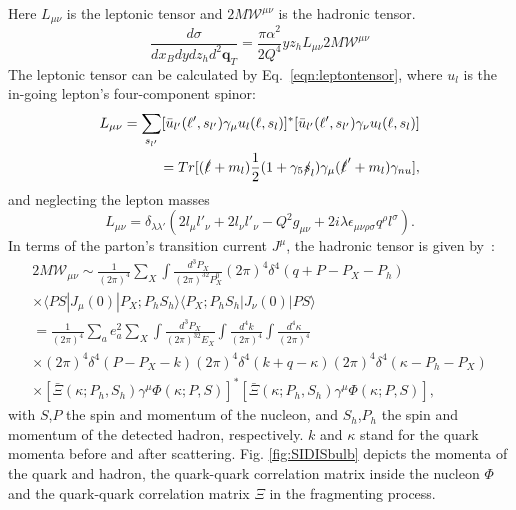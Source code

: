 Here $L_{\mu\nu}$ is the leptonic tensor and $2M\mathcal{W}^{\mu\nu}$ is the hadronic tensor.~\cite{TransversePN,CompleteTreeLevel}
\begin{equation}
\frac{d\sigma}{dx_Bdydz_hd^2\boldsymbol{q}_T} = \frac{\pi \alpha^2}{2Q^4}yz_hL_{\mu\nu}2M\mathcal{W}^{\mu\nu}
\label{eqn:SIDIScrosssubsection}
\end{equation}
The leptonic tensor can be calculated by Eq.~\ref{eqn:leptontensor}, where $u_l$ is the in-going lepton's four-component spinor:
\begin{equation}
\begin{aligned}
L_{\mu\nu}  =\sum_{s_{l'}}[\bar{u}_{l'}(\ell',s_{l'})\gamma_{\mu}u_l(\ell,s_l)]^{\ast}[\bar{u}_{l'}(\ell',s_{l'})\gamma_{\nu}u_l(\ell,s_l)] \\
=Tr[(\slashed{\ell}+m_l)\frac{1}{2}(1+\gamma_5\slashed{s}_l)\gamma_{\mu}(\slashed{\ell}'+m_l)\gamma_{nu}],
\end{aligned}
\label{eqn:leptontensor}
\end{equation}
and neglecting the lepton masses
\begin{equation}
L_{\mu\nu}  =\delta_{\lambda\lambda'}(2l_{\mu}l'_{\nu}+2l_{\nu}l'_{\nu}-Q^2g_{\mu\nu}+2i\lambda\epsilon_{\mu\nu\rho\sigma}q^{\rho}l^{\sigma}).
\label{eqn:leptontensor2}
\end{equation}
In terms of the parton's transition current $J^{\mu}$, the hadronic tensor is given by~\cite{CompleteTreeLevel}:
\begin{equation}
\begin{aligned}
2M\mathcal{W}_{\mu\nu}\sim \frac{1}{(2\pi)^4}\sum_X\int\frac{d^3P_X}{(2\pi)^32P_X^0}(2\pi)^4\delta^4(q+P-P_X-P_h) \\
\times \langle PS|J_\mu(0)|P_X;P_hS_h\rangle\langle P_X;P_hS_h|J_\nu(0)|PS\rangle\\
= \frac{1}{(2\pi)^4}\sum_ae^2_a\sum_X\int\frac{d^3P_X}{(2\pi)^32E_X}\int\frac{d^4k}{(2\pi)^4}\int\frac{d^4\kappa}{(2\pi)^4} \\
\times (2\pi)^4\delta^4(P-P_X-k)(2\pi)^4\delta^4(k+q-\kappa)(2\pi)^4\delta^4(\kappa-P_h-P_X) \\
\times [\bar{\Xi}(\kappa;P_h,S_h)\gamma^\mu\Phi(\kappa;P,S)]^\ast[\bar{\Xi}(\kappa;P_h,S_h)\gamma^\mu\Phi(\kappa;P,S)],
\label{eqn:hadronictensor}
\end{aligned}
\end{equation}
with $S$,$P$ the spin and momentum of the nucleon, and $S_h$,$P_h$ the spin and momentum of the detected hadron, respectively. $k$ and $\kappa$ stand for the quark momenta before and after scattering. Fig. \ref{fig:SIDISbulb} depicts the momenta of the quark and hadron, the quark-quark correlation matrix inside the nucleon $\Phi$ and the quark-quark correlation matrix $\Xi$ in the fragmenting process.~\cite{TransversePN}  %

